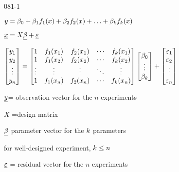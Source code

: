 \begin{mitframe}{081-1}
 \begin{listone}
		\item $y=\texpcoeff_{\init}+\texpcoeff_1\fug_1(\disp)+\texpcoeff_2\fug_2(\disp)+\ldots +\texpcoeff_{\thermcond}\fug_{\thermcond}(\disp)$
        \item $\uline{\disp}=X\uline{\texpcoeff}+\uline{\varepsilon}$
       		\begin{listtwo}
            	\item $\begin{bmatrix} y_1 \\  y_2 \\ \vdots\\ y_n \end{bmatrix}=\begin{bmatrix}1 & \fug_1(\disp_1)  & \fug_2(\disp_1)& \cdots& \fug_{\thermcond}(\disp_1) \\ 1 & \fug_1 (\disp_2)& \fug_2(\disp_2)& \cdots & \fug_{\thermcond}(\disp_2) \\ \vdots & \vdots &  \vdots &\ddots & \vdots \\ 1& \fug_1(\disp_n) & \fug_2(x_n)& \cdots &\fug_{\thermcond}(\disp_n) \end{bmatrix}\begin{bmatrix} \texpcoeff_{\init} \\ \vdots \\ \texpcoeff_{\thermcond}\end{bmatrix}+\begin{bmatrix}\varepsilon_1\\ \varepsilon_2\\ \vdots \\ \varepsilon_n\end{bmatrix}$
                
              \begin{listthree}
              	\item $\uline{y}$= observation vector for the $n$ experiments
                \item $X$ =design matrix
                \item $\uline{\texpcoeff}$ parameter vector for the $\thermcond$ parameters
                	\begin{listfour}
                    	\item for well-designed experiment, $\thermcond\leq{n}$
                    \end{listfour}
                \item $\uline{\varepsilon}$ = residual vector for the $n$
experiments              \end{listthree}  
            \end{listtwo}
\end{listone}       
\end{mitframe}
